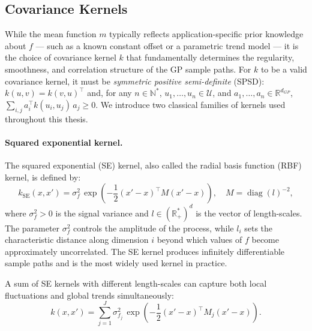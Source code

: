 \subsection{Covariance Kernels}

While the mean function $m$ typically reflects application-specific prior
knowledge about $f$ --- such as a known constant offset or a parametric
trend model --- it is the choice of covariance kernel $k$ that fundamentally
determines the regularity, smoothness, and correlation structure of the GP
sample paths. For $k$ to be a valid covariance kernel, it must be
\emph{symmetric positive semi-definite} (SPSD): $k(u,v) = k(v,u)^\top$ and, for any
$n \in \mathbb{N}^*$, $u_1, \ldots, u_n \in \mathcal{U}$, and
$a_1, \ldots, a_n \in \mathbb{R}^{d_{GP}}$,
$\sum_{i,j} a_i^\top k(u_i, u_j)\, a_j \geq 0$. We introduce two
classical families of kernels used throughout this thesis.

\paragraph{Squared exponential kernel.}
The squared exponential (SE) kernel, also called the radial basis function
(RBF) kernel, is defined by:
\begin{equation}
    k_{\text{SE}}(x, x') = \sigma_f^2\,\exp\!\left(
        -\frac{1}{2}(x'-x)^\top M (x'-x)
    \right), \quad M = \operatorname{diag}(l)^{-2},
    \label{eq:SE_kernel}
\end{equation}
where $\sigma_f^2 > 0$ is the signal variance and $l \in (\mathbb{R}_+^*)^d$
is the vector of length-scales. The parameter $\sigma_f^2$ controls the
amplitude of the process, while $l_i$ sets the characteristic distance along
dimension $i$ beyond which values of $f$ become approximately uncorrelated.
The SE kernel produces infinitely differentiable sample paths and is the most
widely used kernel in practice.

A sum of SE kernels with different length-scales can capture both local
fluctuations and global trends simultaneously:
\begin{equation}
    k(x, x') = \sum_{j=1}^J \sigma_{f_j}^2\,\exp\!\left(
        -\frac{1}{2}(x'-x)^\top M_j (x'-x)
    \right).
    \label{eq:SE_mixture}
\end{equation}

